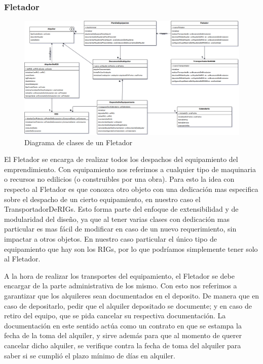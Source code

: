 \documentclass[10pt,a4paper]{article}
\begin{document}
\subsubsection{Fletador}

\begin{figure}[H]
\centerline{\includegraphics[scale=0.38]{images/DiagramaDeClases_deFletador.png}}
\caption{Diagrama de clases de un Fletador}
\end{figure}

El Fletador se encarga de realizar todos los despachos del equipamiento del emprendimiento. Con equipamiento nos referimos a cualquier tipo de maquinaria o recursos no edilicios (o construibles por una obra). Para esto la idea con respecto al Fletador es que conozca otro objeto con una dedicación mas especifica sobre el despacho de un cierto equipamiento, en nuestro caso el TransportadorDeRIGs. Esto forma parte del enfoque de extensibilidad y de modularidad del diseño, ya que al tener varias clases con dedicación mas particular es mas fácil de modificar en caso de un nuevo requerimiento, sin impactar a otros objetos. En nuestro caso particular el único tipo de equipamiento que hay son los RIGs, por lo que podríamos simplemente tener solo al Fletador.

A la hora de realizar los transportes del equipamiento, el Fletador se debe encargar de la parte administrativa de los mismo. Con esto nos referimos a garantizar que los alquileres sean documentados en el deposito. De manera que en caso de depositarlo, pedir que el alquiler depositado se documente; y en caso de retiro del equipo, que se pida cancelar su respectiva documentación. La documentación en este sentido actúa como un contrato en que se estampa la fecha de la toma del alquiler, y sirve además para que al momento de querer cancelar dicho alquiler, se verifique contra la fecha de toma del alquiler para saber si se cumplió el plazo mínimo de días en alquiler.
\end{document}
